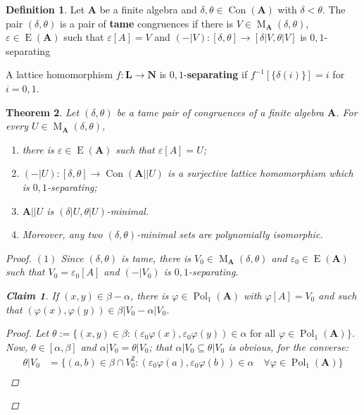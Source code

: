 \documentclass{amsart}
\theoremstyle{plain}
\newtheorem{theorem}{Theorem}[section]
\newtheorem{claim}{Claim}
\theoremstyle{definition}
\newtheorem{definition}[theorem]{Definition}
\theoremstyle{remark}
\def\phi{\varphi}
\def\epsilon{\varepsilon}
\def\A{\forall}
\DeclareMathOperator{\Con}{Con}
\DeclareMathOperator{\Pol}{Pol}
\DeclareMathOperator{\Id}{E}
\DeclareMathOperator{\M}{M}
\begin{document}
\begin{definition}
    Let $\mathbf{A}$ be a finite algebra and $\delta, \theta \in \Con(\mathbf{A})$ with $\delta < \theta$. 
    The pair $(\delta, \theta)$ is a pair of \textbf{tame} congruences if there is $V \in \M_{\mathbf{A}}(\delta, \theta)$, $\epsilon \in \Id(\mathbf{A})$ such that $\epsilon[A]=V$ and 
    $(-|V): [\delta, \theta] \to [\delta|V, \theta|V]$ is $0,1$-separating
    
    A lattice homomorphism $f: \mathbf{L} \to \mathbf{N}$ is $0,1$-\textbf{separating} if $f^{-1}[\{\delta(i)\}]=i$ for $i=0,1$. 
\end{definition}

\begin{theorem}
    Let $(\delta, \theta)$ be a tame pair of congruences of a finite algebra $\mathbf{A}$.
    For every $U \in \M_{\mathbf{A}}(\delta, \theta)$, 
    \begin{enumerate} 
        \item there  is $\epsilon \in \Id(\mathbf{A})$ such that $\epsilon[A]=U$; 
        \item $(-|U): [\delta, \theta] \to \Con(\mathbf{A}||U)$ is a surjective lattice homomorphism which is $0,1$-separating;
        \item $\mathbf{A}||U$ is $(\delta|U, \theta|U)$-minimal. 
        \item Moreover, any two $(\delta, \theta)$-minimal sets are polynomially isomorphic. 
    \end{enumerate}
    \begin{proof}
        $(1)$ Since $(\delta, \theta)$ is tame, there is $V_0 \in \M_\mathbf{A}(\delta,\theta)$ and $\epsilon_0 \in \Id(\mathbf{A})$ such that $V_0 = \epsilon_0[A]$ and $(-|V_0)$ is $0,1$-separating. 
        \begin{claim}
            \label{lemma_pol_claim1}
            If $(x,y) \in \beta - \alpha$, there is $\phi \in \Pol_1(\mathbf{A})$ with $\phi[A]=V_0$ and such that $(\phi(x), \phi(y)) \in \beta|V_0 - \alpha|V_0$. 
            \begin{proof}
                Let $\theta:=\{(x,y) \in \beta : (\epsilon_0 \phi (x), \epsilon_0 \phi(y)) \in \alpha \text{ for all } \phi \in \Pol_1(\mathbf{A})\}$. 
                Now, $\theta \in [\alpha, \beta]$ and $\alpha |V_0 = \theta|V_0$; 
                that $\alpha |V_0 \subseteq \theta|V_0$ is obvious, for the converse: 
                \begin{align*}
                    \theta|V_0 & = \{ (a,b) \in \beta \cap V^2_0: (\epsilon_0 \phi (a), \epsilon_0 \phi(b)) \in \alpha \quad \A \phi \in \Pol_1(\mathbf{A})\}  \\

\end{align*}
\end{proof}
\end{claim}
\end{proof}
\end{theorem}
\end{document}
